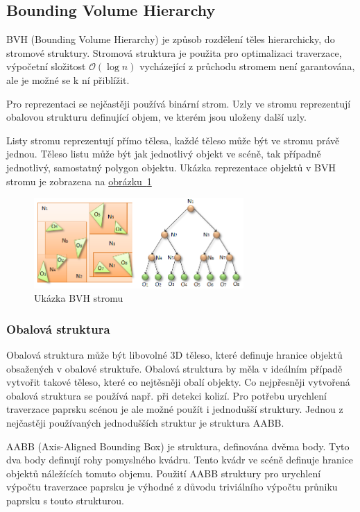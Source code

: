 \documentclass[czech,master]{diploma}
\begin{document}
\subsection{Bounding Volume Hierarchy}
BVH (Bounding Volume Hierarchy) je způsob rozdělení těles hierarchicky, do stromové struktury. Stromová struktura je použita pro optimalizaci traverzace, výpočetní složitost \(\mathcal{O}(\log n)\) vycházející z průchodu stromem není garantována, ale je možné se k ní přiblížit\cite{Meister2018}.\par Pro reprezentaci se nejčastěji používá binární strom. Uzly ve stromu reprezentují obalovou strukturu definující objem, ve kterém jsou uloženy další uzly.\par
Listy stromu reprezentují přímo tělesa, každé těleso může být ve stromu právě jednou. Těleso listu může být jak jednotlivý objekt ve scéně, tak případně jednotlivý, samostatný polygon objektu. Ukázka reprezentace objektů v BVH stromu je zobrazena na \hyperref[fig:bvh]{obrázku~\ref{fig:bvh}}

\begin{figure}[ht]%
  \centering
  \includegraphics[width=8cm]{Figures/bvh.png}%
  \caption[Ukázka BVH stromu]{Ukázka BVH stromu~\cite{BVH}}%
  \label{fig:bvh}%
\end{figure}

\subsubsection*{Obalová struktura}
Obalová struktura může být libovolné 3D těleso, které definuje hranice objektů obsažených v obalové struktuře. Obalová struktura by měla v ideálním případě vytvořit takové těleso, které co nejtěsněji obalí objekty. Co nejpřesněji vytvořená obalová struktura se používá např. při detekci kolizí. Pro potřebu urychlení traverzace paprsku scénou je ale možné použít i jednodušší struktury. Jednou z nejčastěji používaných jednodušších struktur je struktura AABB.\par
AABB (Axis-Aligned Bounding Box) je struktura, definována dvěma body. Tyto dva body definují rohy pomyslného kvádru. Tento kvádr ve scéně definuje hranice objektů náležících tomuto objemu. Použití AABB struktury pro urychlení výpočtu traverzace paprsku je výhodné z důvodu triviálního výpočtu průniku paprsku s touto strukturou.
\end{document}
